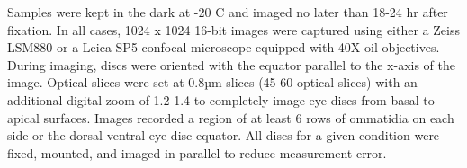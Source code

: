 Samples were kept in the dark at -20 \textdegree{}C and imaged no later than 18-24 hr after fixation. In all cases, 1024 x 1024 16-bit images were captured using either a Zeiss LSM880 or a Leica SP5 confocal microscope equipped with 40X oil objectives. During imaging, discs were oriented with the equator parallel to the x-axis of the image. Optical slices were set at 0.8µm slices (45-60 optical slices) with an additional digital zoom of 1.2-1.4 to completely image eye discs from basal to apical surfaces. Images recorded a region of at least 6 rows of ommatidia on each side or the dorsal-ventral eye disc equator. All discs for a given condition were fixed, mounted, and imaged in parallel to reduce measurement error.
